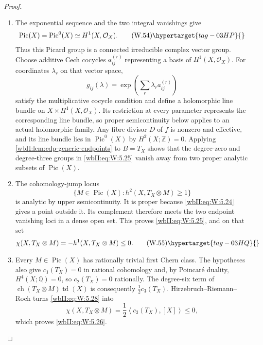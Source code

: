 \begin{proof}

\begin{enumerate}[label={$\langle1\rangle$\arabic*.},leftmargin=*]
\item The exponential sequence and the two integral vanishings give
\[
 \operatorname{Pic}(X)=\operatorname{Pic}^0(X)
 \simeq H^1(X,\mathcal O_X).
\tag{W.54}\hypertarget{tag-03HP}{}\label{wbII:eq:W:5.27}
\]
Thus this Picard group is a connected irreducible complex vector group.
Choose additive Cech cocycles $a^{(r)}_{ij}$ representing a basis of
$H^1(X,\mathcal O_X)$. For coordinates $\lambda_r$ on that vector space,
\[
 g_{ij}(\lambda)=\exp\!\left(\sum_r\lambda_r a^{(r)}_{ij}\right)
\]
satisfy the multiplicative cocycle condition and define a holomorphic
line bundle on $X\times H^1(X,\mathcal O_X)$. Its restriction at every
parameter represents the corresponding line bundle, so proper
semicontinuity below applies to an actual holomorphic family.  Any fibre divisor \(D\) of
\(f\) is nonzero and effective, and its line bundle lies in
\(\operatorname{Pic}^0(X)\) by \(H^2(X;\mathbb Z)=0\).  Applying
\cref{wbII:lem:cdp-generic-endpoints} to \(B=T_X\) shows that the degree-zero and
degree-three groups in \eqref{wbII:eq:W:5.25} vanish away from two proper analytic subsets
of \(\operatorname{Pic}(X)\).

\item The cohomology-jump locus
\[
 \{M\in\operatorname{Pic}(X):h^2(X,T_X\otimes M)\ge1\}
\]
is analytic by upper semicontinuity.  It is proper because \eqref{wbII:eq:W:5.24} gives a
point outside it.  Its complement therefore meets the two endpoint
vanishing loci in a dense open set.  This proves \eqref{wbII:eq:W:5.25}, and on that set
\[
 \chi(X,T_X\otimes M)=-h^1(X,T_X\otimes M)\le0.
\tag{W.55}\hypertarget{tag-03HQ}{}\label{wbII:eq:W:5.28}
\]

\item Every \(M\in\operatorname{Pic}(X)\) has rationally trivial first Chern
class.  The hypotheses also give \(c_1(T_X)=0\) in rational cohomology and,
by Poincar\'e duality, \(H^4(X;\mathbb Q)=0\), so
\(c_2(T_X)=0\) rationally.  The degree-six term of
\(\operatorname{ch}(T_X\otimes M)\operatorname{td}(X)\) is consequently
\(\tfrac12c_3(T_X)\).  Hirzebruch--Riemann--Roch turns \eqref{wbII:eq:W:5.28} into
\[
 \chi(X,T_X\otimes M)
 =\frac12\left\langle c_3(T_X),[X]\right\rangle\le0,
\]
which proves \eqref{wbII:eq:W:5.26}.

\end{enumerate}
\end{proof}
